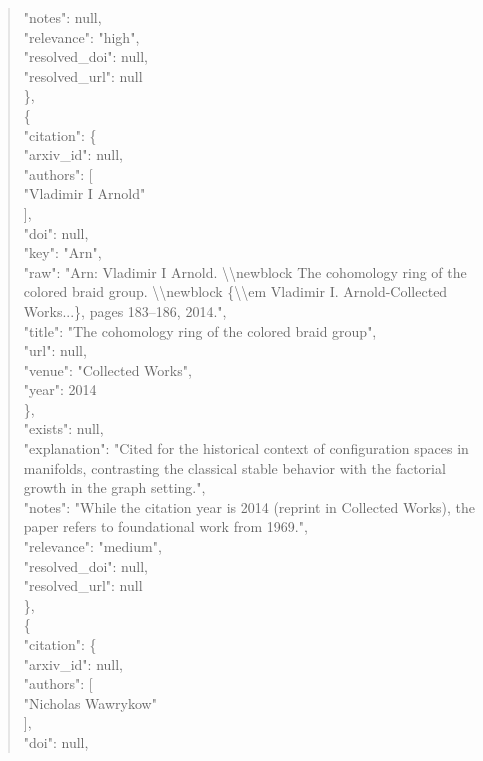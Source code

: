 \documentclass[11pt]{article}
\begin{document}
\begin{quote}
      "notes": null,\\
      "relevance": "high",\\
      "resolved\_doi": null,\\
      "resolved\_url": null\\
    \},\\
    \{\\
      "citation": \{\\
        "arxiv\_id": null,\\
        "authors": [\\
          "Vladimir I Arnold"\\
        ],\\
        "doi": null,\\
        "key": "Arn",\\
        "raw": "Arn: Vladimir I Arnold. \textbackslash{}\textbackslash{}newblock The cohomology ring of the colored braid group. \textbackslash{}\textbackslash{}newblock \{\textbackslash{}\textbackslash{}em Vladimir I. Arnold-Collected Works...\}, pages 183--186, 2014.",\\
        "title": "The cohomology ring of the colored braid group",\\
        "url": null,\\
        "venue": "Collected Works",\\
        "year": 2014\\
      \},\\
      "exists": null,\\
      "explanation": "Cited for the historical context of configuration spaces in manifolds, contrasting the classical stable behavior with the factorial growth in the graph setting.",\\
      "notes": "While the citation year is 2014 (reprint in Collected Works), the paper refers to foundational work from 1969.",\\
      "relevance": "medium",\\
      "resolved\_doi": null,\\
      "resolved\_url": null\\
    \},\\
    \{\\
      "citation": \{\\
        "arxiv\_id": null,\\
        "authors": [\\
          "Nicholas Wawrykow"\\
        ],\\
        "doi": null,\\

\end{quote}
\end{document}
